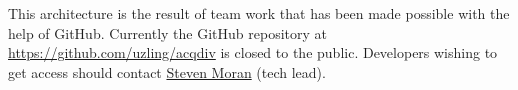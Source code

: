\documentclass[a4paper, 11pt]{book}
\begin{document}
This architecture is the result of team work that has been made possible with the help of GitHub. Currently the GitHub repository at \url{https://github.com/uzling/acqdiv} is closed to the public. Developers wishing to get access should contact \href{mailto:steven.moran@uzh.ch}{Steven Moran} (tech lead). 

%


\newpage
 

\end{document}
